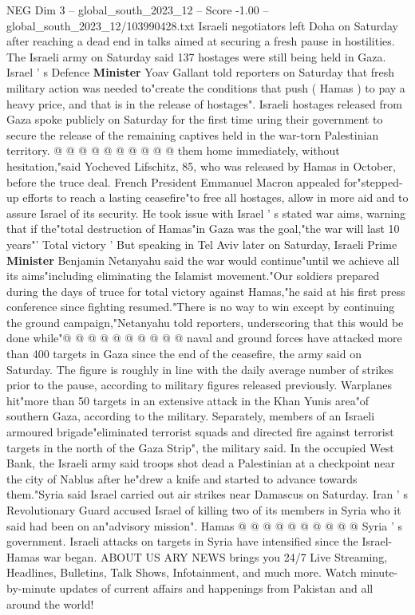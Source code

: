 \begin{textsample}{NEG Dim 3 – global\_south\_2023\_12 – Score -1.00 – global\_south\_2023\_12/103990428.txt}
Israeli negotiators left Doha on Saturday after reaching a dead end in talks aimed at securing a fresh pause in hostilities.
The Israeli army on Saturday said 137 hostages were still being held in Gaza.
Israel ' s Defence \textbf{Minister} Yoav Gallant told reporters on Saturday that fresh military action was needed to"create the conditions that push ( Hamas ) to pay a heavy price, and that is in the release of hostages".
Israeli hostages released from Gaza spoke publicly on Saturday for the first time uring their government to secure the release of the remaining captives held in the war-torn Palestinian territory. @ @ @ @ @ @ @ @ @ @ them home immediately, without hesitation,"said Yocheved Lifschitz, 85, who was released by Hamas in October, before the truce deal.
French President Emmanuel Macron appealed for"stepped-up efforts to reach a lasting ceasefire"to free all hostages, allow in more aid and to assure Israel of its security.
He took issue with Israel ' s stated war aims, warning that if the"total destruction of Hamas"in Gaza was the goal,"the war will last 10 years"' Total victory ' But speaking in Tel Aviv later on Saturday, Israeli Prime \textbf{Minister} Benjamin Netanyahu said the war would continue"until we achieve all its aims"including eliminating the Islamist movement."Our soldiers prepared during the days of truce for total victory against Hamas,"he said at his first press conference since fighting resumed."There is no way to win except by continuing the ground campaign,"Netanyahu told reporters, underscoring that this would be done while"@ @ @ @ @ @ @ @ @ @ naval and ground forces have attacked more than 400 targets in Gaza since the end of the ceasefire, the army said on Saturday.
The figure is roughly in line with the daily average number of strikes prior to the pause, according to military figures released previously.
Warplanes hit"more than 50 targets in an extensive attack in the Khan Yunis area"of southern Gaza, according to the military.
Separately, members of an Israeli armoured brigade"eliminated terrorist squads and directed fire against terrorist targets in the north of the Gaza Strip", the military said.
In the occupied West Bank, the Israeli army said troops shot dead a Palestinian at a checkpoint near the city of Nablus after he"drew a knife and started to advance towards them."Syria said Israel carried out air strikes near Damascus on Saturday.
Iran ' s Revolutionary Guard accused Israel of killing two of its members in Syria who it said had been on an"advisory mission".
Hamas @ @ @ @ @ @ @ @ @ @ Syria ' s government.
Israeli attacks on targets in Syria have intensified since the Israel-Hamas war began.
ABOUT US ARY NEWS brings you 24/7 Live Streaming, Headlines, Bulletins, Talk Shows, Infotainment, and much more.
Watch minute-by-minute updates of current affairs and happenings from Pakistan and all around the world!

\end{textsample}
